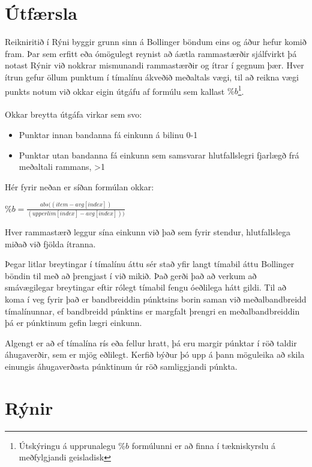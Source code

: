 \documentclass{article}
\begin{document}
\section{Útfærsla}
\label{sec:imp_our}

Reikniritið í Rýni byggir grunn sinn á Bollinger böndum eins og áður hefur komið fram.
Þar sem erfitt eða ómögulegt reynist að áætla rammastærðir sjálfvirkt þá notast Rýnir við nokkrar mismunandi
rammastærðir og ítrar í gegnum þær. Hver ítrun gefur öllum punktum í tímalínu ákveðið meðaltals vægi, til að reikna
vægi punkts notum við okkar eigin útgáfu af formúlu sem kallast 
$\%b$\footnote[1]{Útskýringu á upprunalegu $\%b$ formúlunni er að finna í tækniskyrslu á meðfylgjandi geisladisk}. 
\\ \hfil
\\ \hfil
Okkar breytta útgáfa virkar sem svo:
\begin{itemize}
  \item Punktar innan bandanna fá einkunn á bilinu 0-1
  \item Punktar utan bandanna fá einkunn sem samsvarar hlutfallslegri fjarlægð frá meðaltali rammans, >1
\end{itemize}


Hér fyrir neðan er síðan formúlan okkar:


\begin{center}
  $\%b=\frac{abs((item - avg[index])}{(upperlim[index] - avg[index]))}$
\end{center}


Hver rammastærð leggur sína einkunn við það sem fyrir stendur, hlutfallslega
miðað við fjölda ítranna.

Þegar litlar breytingar í tímalínu áttu sér stað yfir langt tímabil áttu
Bollinger böndin til með að 
þrengjast í við mikið. Það gerði það að verkum að smávægilegar breytingar eftir
rólegt tímabil fengu
óeðlilega hátt gildi. Til að koma í veg fyrir það er bandbreiddin púnktsins
borin saman við meðalbandbreidd
tímalínunnar, ef bandbreidd púnktins er margfalt þrengri en meðalbandbreiddin þá
er púnktinum gefin lægri einkunn. 

Algengt er að ef tímalína rís eða fellur hratt, þá eru margir púnktar í röð
taldir áhugaverðir, sem er mjög eðlilegt.
Kerfið býður þó upp á þann möguleika að skila einungis áhugaverðasta púnktinum
úr röð samliggjandi púnkta.




\section{Rýnir}
\label{sec:implementation}
\end{document}
